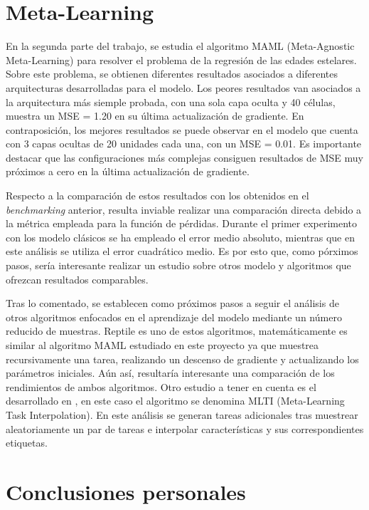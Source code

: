 \section{Meta-Learning}

En la segunda parte del trabajo, se estudia el algoritmo MAML (Meta-Agnostic Meta-Learning) para resolver el problema de la regresión de las edades estelares. Sobre este problema, se obtienen diferentes resultados asociados a diferentes arquitecturas desarrolladas para el modelo. Los peores resultados van asociados a la arquitectura más siemple probada, con una sola capa oculta y 40 células, muestra un MSE = 1.20 en su última actualización de gradiente. En contraposición, los mejores resultados se puede observar en el modelo que cuenta con 3 capas ocultas de 20 unidades cada una, con un MSE = 0.01. 
Es importante destacar que las configuraciones más complejas consiguen resultados de MSE muy próximos a cero en la última actualización de gradiente.

Respecto a la comparación de estos resultados con los obtenidos en el \emph{benchmarking} anterior, resulta inviable realizar una comparación directa debido a la métrica empleada para la función de pérdidas. Durante el primer experimento con los modelo clásicos se ha empleado el error medio absoluto, mientras que en este análisis se utiliza el error cuadrático medio. Es por esto que, como pórximos pasos, sería interesante realizar un estudio sobre otros modelo y algoritmos que ofrezcan resultados comparables.

Tras lo comentado, se establecen como próximos pasos a seguir el análisis de otros algoritmos enfocados en el aprendizaje del modelo mediante un número reducido de muestras. Reptile \cite{nichol2018firstorder} es uno de estos algoritmos, matemáticamente es similar al algoritmo MAML estudiado en este proyecto ya que muestrea recursivamente una tarea, realizando un descenso de gradiente y actualizando los parámetros iniciales. Aún así, resultaría interesante una comparación de los rendimientos de ambos algoritmos. Otro estudio a tener en cuenta es el desarrollado en \cite{yao2021metalearning}, en este caso el algoritmo se denomina MLTI (Meta-Learning Task Interpolation). En este análisis se generan tareas adicionales tras muestrear aleatoriamente un par de tareas e interpolar características y sus correspondientes etiquetas.
 

\section{Conclusiones personales}

